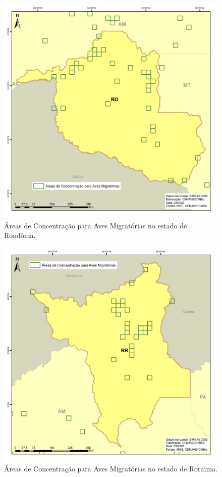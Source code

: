 \documentclass[
  oneside]{scrbook}
\begin{document}
\begin{figure}[H]

{\centering \includegraphics[width=0.75\linewidth]{imagens/cap07/Figura_7.24_RO} 

}

\caption{Áreas de Concentração para Aves Migratórias no estado de Rondônia.}\label{fig:44}
\end{figure}

\begin{figure}[H]

{\centering \includegraphics[width=0.75\linewidth]{imagens/cap07/Figura_7.25_RR} 

}

\caption{Áreas de Concentração para Aves Migratórias no estado de Roraima.}\label{fig:45}
\end{figure}
\end{document}
